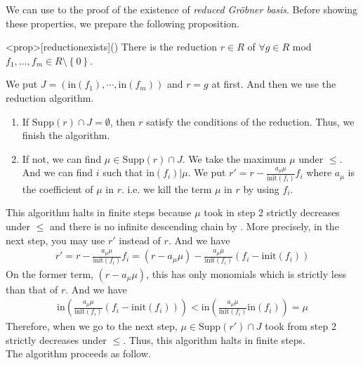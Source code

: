 \documentclass{article}
\begin{document}
We can use to the proof of the existence of \textit{reduced Gr\"{o}bner basis}. Before showing these properties, we prepare the following proposition.

\begin{statementsp}<prop>[reductionexists]()
    There is the reduction $r \in R$ of $\forall g \in R$ mod $f_1, \ldots, f_m \in R \setminus \left\{ 0 \right\}$.
\end{statementsp}
\begin{pfsp}
    We put $J = \left( \mathrm{in}(f_1), \cdots, \mathrm{in}(f_m) \right)$ and $r = g$ at first. And then we use the reduction algorithm.
    \begin{enumerate}
        \item If $\mathrm{Supp}(r) \cap J = \emptyset$, then $r$ satisfy the conditions of the reduction. Thus, we finish the algorithm.
        \item If not, we can find $\mu \in \mathrm{Supp}(r) \cap J$. We take the maximum $\mu$ under $\leq$. And we can find $i$ such that $\mathrm{in}(f_i) \vert \mu$. We put $\displaystyle{r' = r - \frac{a_{\mu} \mu}{\mathrm{init}(f_i)} f_i}$ where $a_{\mu}$ is the coefficient of $\mu$ in $r$. i.e. we kill the term $\mu$ in $r$ by using $f_i$. 
    \end{enumerate}
    This algorithm halts in finite steps because $\mu$ took in step 2 strictly decreases under $\leq$ and there is no infinite descending chain by . More precisely, in the next step, you may use $r'$ instead of $r$. And we have
    \begin{align}
        r' = r - \frac{a_{\mu} \mu}{\mathrm{init}(f_i)} f_i = (r - a_{\mu} \mu) - \frac{a_{\mu} \mu}{\mathrm{init}(f_i)} \left( f_i - \mathrm{init}(f_i) \right)
    \end{align}
    On the former term, $(r-a_{\mu} \mu)$, this has only monomials which is strictly less than that of $r$. And we have
    \begin{align}
        \mathrm{in} \left( \frac{a_{\mu} \mu}{\mathrm{init}(f_i)} \left( f_i - \mathrm{init}(f_i) \right) \right) < \mathrm{in} \left( \frac{a_{\mu} \mu}{\mathrm{init}(f_i)} \mathrm{in}(f_i) \right) = \mu
    \end{align}
    Therefore, when we go to the next step, $\mu \in \mathrm{Supp}(r') \cap J$ took from step 2 strictly decreases under $\leq$. Thus, this algorithm halts in finite steps.\\ 
    The algorithm proceeds as follow. 
    \begin{enumerate}

\end{enumerate}
\end{pfsp}
\end{document}

